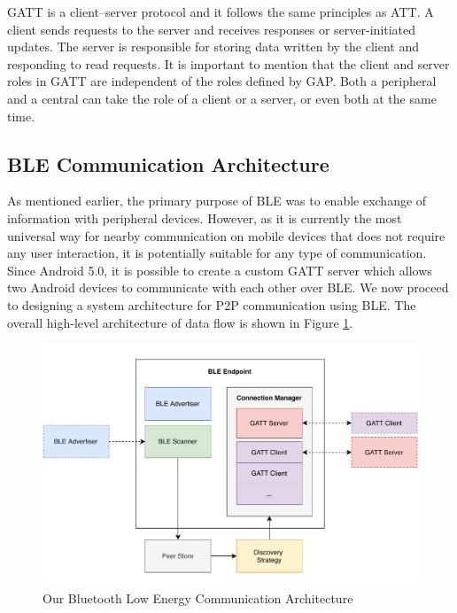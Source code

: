 GATT is a client–server protocol and it follows the same principles as ATT. A client sends requests to the server and receives responses or server-initiated updates. The server is responsible for storing data written by the client and responding to read requests. It is important to mention that the client and server roles in GATT are independent of the roles defined by GAP. Both a peripheral and a central can take the role of a client or a server, or even both at the same time.



\subsection{BLE Communication Architecture}

As mentioned earlier, the primary purpose of BLE was to enable exchange of information with peripheral devices. However, as it is currently the most universal way for nearby communication on mobile devices that does not require any user interaction, it is potentially suitable for any type of communication. Since Android 5.0, it is possible to create a custom GATT server which allows two Android devices to communicate with each other over BLE. We now proceed to designing a system architecture for P2P communication using BLE. The overall high-level architecture of data flow is shown in Figure \ref{ble_architecture}.

\begin{figure}
    \includegraphics[width=\textwidth]{diagrams/ipv8-ble-architecture}
    \caption{Our Bluetooth Low Energy Communication Architecture}
    \label{ble_architecture}
\end{figure}

